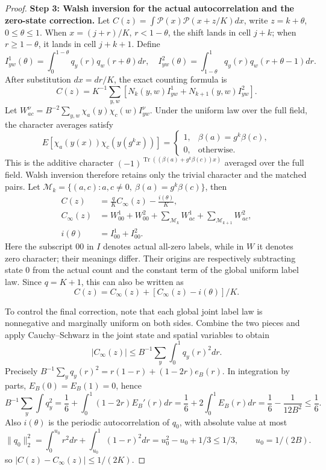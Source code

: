 \documentclass[a4paper,11pt]{article}
\theoremstyle{remark}
\begin{document}
\begin{proof}
\textbf{Step 3: Walsh inversion for the actual autocorrelation and the zero-state correction.}
Let $C(z)=\int\mathcal P(x)\mathcal P(x+z/K)dx$, write $z=k+\theta$,
$0\le\theta\le1$. When $x=(j+r)/K$, $r<1-\theta$, the shift lands in cell
$j+k$; when $r\ge1-\theta$, it lands in cell $j+k+1$.
Define
\[
 I^1_{yw}(\theta)=\int_0^{1-\theta}q_y(r)q_w(r+\theta)dr,
 \quad I^2_{yw}(\theta)=\int_{1-\theta}^1q_y(r)q_w(r+\theta-1)dr.
\]
After substitution $dx=dr/K$, the exact counting formula is
\[
 C(z)=K^{-1}\sum_{y,w}[N_k(y,w)I^1_{yw}+N_{k+1}(y,w)I^2_{yw}].
\]
Let $W^\nu_{ac}=B^{-2}\sum_{y,w}\chi_a(y)\chi_c(w)I^\nu_{yw}$.
Under the uniform law over the full field, the character averages satisfy
\[
 E[\chi_a(y(x))\chi_c(y(g^kx))]
 =\begin{cases}1,&\beta(a)=g^k\beta(c),\\0,&\text{otherwise}.
 \end{cases}
\]
This is the additive character $(-1)^{\operatorname{Tr}((\beta(a)+g^k\beta(c))x)}$
averaged over the full field. Walsh inversion therefore retains only the trivial character and the matched pairs.
Let $\mathcal M_k=\{(a,c):a,c\ne0,\ \beta(a)=g^k\beta(c)\}$, then
\begin{align*}
 C(z)&=\frac qK C_\infty(z)-\frac{i(\theta)}K,\\
 C_\infty(z)&=W^1_{00}+W^2_{00}
 +\sum_{\mathcal M_k}W^1_{ac}+\sum_{\mathcal M_{k+1}}W^2_{ac},\\
 i(\theta)&=I^1_{00}+I^2_{00}.
\end{align*}
Here the subscript $00$ in $I$ denotes actual all-zero labels, while in $W$ it denotes zero character; their meanings differ.
Their origins are respectively subtracting state 0 from the actual count and the constant term of the global uniform label law.
Since $q=K+1$, this can also be written as
\[
 C(z)=C_\infty(z)+[C_\infty(z)-i(\theta)]/K.
\]

To control the final correction, note that each global joint label law is nonnegative and marginally uniform on both sides.
Combine the two pieces and apply Cauchy--Schwarz in the joint state and spatial variables to obtain
\[
 |C_\infty(z)|\le B^{-1}\sum_y\int_0^1q_y(r)^2dr.
\]
Precisely $B^{-1}\sum_yq_y(r)^2=r(1-r)+(1-2r)e_B(r)$.
In integration by parts, $E_B(0)=E_B(1)=0$, hence
\[
 B^{-1}\sum_y\int q_y^2
 =\frac16+\int_0^1(1-2r)E_B'(r)dr
 =\frac16+2\int_0^1E_B(r)dr
 =\frac16-\frac1{12B^2}\le\frac16.
\]
Also $i(\theta)$ is the periodic autocorrelation of $q_0$, with absolute value at most
\[
 \|q_0\|_2^2=\int_0^{u_0}r^2dr+\int_{u_0}^1(1-r)^2dr
 =u_0^2-u_0+1/3\le1/3,\qquad u_0=1/(2B).
\]
so $|C(z)-C_\infty(z)|\le1/(2K)$.


\end{proof}
\end{document}
